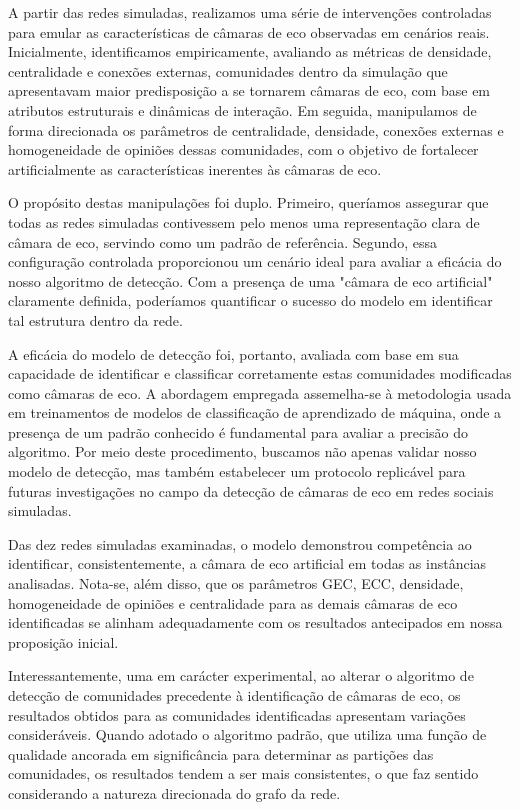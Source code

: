 A partir das redes simuladas, realizamos uma série de intervenções controladas para emular as características de câmaras de eco observadas em cenários reais. Inicialmente, identificamos empiricamente, avaliando as métricas de densidade, centralidade e conexões externas, comunidades dentro da simulação que apresentavam maior predisposição a se tornarem câmaras de eco, com base em atributos estruturais e dinâmicas de interação. Em seguida, manipulamos de forma direcionada os parâmetros de centralidade, densidade, conexões externas e homogeneidade de opiniões dessas comunidades, com o objetivo de fortalecer artificialmente as características inerentes às câmaras de eco.

O propósito destas manipulações foi duplo. Primeiro, queríamos assegurar que todas as redes simuladas contivessem pelo menos uma representação clara de câmara de eco, servindo como um padrão de referência. Segundo, essa configuração controlada proporcionou um cenário ideal para avaliar a eficácia do nosso algoritmo de detecção. Com a presença de uma "câmara de eco artificial" claramente definida, poderíamos quantificar o sucesso do modelo em identificar tal estrutura dentro da rede.

A eficácia do modelo de detecção foi, portanto, avaliada com base em sua capacidade de identificar e classificar corretamente estas comunidades modificadas como câmaras de eco. A abordagem empregada assemelha-se à metodologia usada em treinamentos de modelos de classificação de aprendizado de máquina, onde a presença de um padrão conhecido é fundamental para avaliar a precisão do algoritmo. Por meio deste procedimento, buscamos não apenas validar nosso modelo de detecção, mas também estabelecer um protocolo replicável para futuras investigações no campo da detecção de câmaras de eco em redes sociais simuladas.

Das dez redes simuladas examinadas, o modelo demonstrou competência ao identificar, consistentemente, a câmara de eco artificial em todas as instâncias analisadas. Nota-se, além disso, que os parâmetros GEC, ECC, densidade, homogeneidade de opiniões e centralidade para as demais câmaras de eco identificadas se alinham adequadamente com os resultados antecipados em nossa proposição inicial.

Interessantemente, uma em carácter experimental, ao alterar o algoritmo de detecção de comunidades precedente à identificação de câmaras de eco, os resultados obtidos para as comunidades identificadas apresentam variações consideráveis. Quando adotado o algoritmo padrão, que utiliza uma função de qualidade ancorada em significância para determinar as partições das comunidades, os resultados tendem a ser mais consistentes, o que faz sentido considerando a natureza direcionada do grafo da rede.

